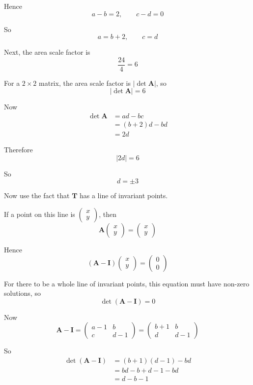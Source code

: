 \documentclass[leqno]{article}
\begin{document}
\begin{enumerate}[
  label=\textbf{\arabic*.},
  leftmargin=*,
  topsep=0pt,
  partopsep=0pt,
  parsep=0pt
]
\begin{tcolorbox}[colback=white, colframe=scarlet, title={\textbf{Solution}}, breakable, grow to left by=6mm, grow to right by=10mm]
\begin{enumerate}[label=\textbf{(\roman*)}]
Hence
\[
a-b=2,\qquad c-d=0
\]

So
\[
a=b+2,\qquad c=d
\]

Next, the area scale factor is
\[
\frac{24}{4}=6
\]

For a $2\times2$ matrix, the area scale factor is $|\det \mathbf A|$, so
\[
|\det \mathbf A|=6
\]

Now
\begin{align*}
\det \mathbf A&=ad-bc\\
&=(b+2)d-bd\\
&=2d
\end{align*}

Therefore
\[
|2d|=6
\]

So
\[
d=\pm3
\]

Now use the fact that $\mathbf T$ has a line of invariant points.

If a point on this line is $\begin{pmatrix}x\\y\end{pmatrix}$, then
\[
\mathbf A\begin{pmatrix}x\\y\end{pmatrix}=\begin{pmatrix}x\\y\end{pmatrix}
\]

Hence
\[
(\mathbf A-\mathbf I)\begin{pmatrix}x\\y\end{pmatrix}=\begin{pmatrix}0\\0\end{pmatrix}
\]

For there to be a whole line of invariant points, this equation must have non-zero solutions, so
\[
\det(\mathbf A-\mathbf I)=0
\]

Now
\[
\mathbf A-\mathbf I=
\begin{pmatrix}
a-1 & b\\
c & d-1
\end{pmatrix}
=
\begin{pmatrix}
b+1 & b\\
d & d-1
\end{pmatrix}
\]

So
\begin{align*}
\det(\mathbf A-\mathbf I)
&=(b+1)(d-1)-bd\\
&=bd-b+d-1-bd\\
&=d-b-1
\end{align*}


\end{enumerate}
\end{tcolorbox}
\end{enumerate}
\end{document}
